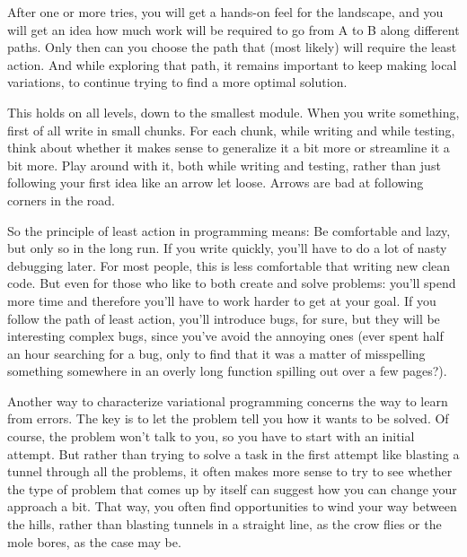 After one or more tries, you will get a hands-on feel for the landscape,
and you will get an idea how much work will be required to go from A
to B along different paths.  Only then can you choose the path that
(most likely) will require the least action.  And while exploring that
path, it remains important to keep making local variations, to
continue trying to find a more optimal solution.

This holds on all levels, down to the smallest module.
When you write something, first of all write in small
chunks.  For each chunk, while writing and while testing, think about
whether it makes sense to generalize it a bit more or streamline it a
bit more.  Play around with it, both while writing and testing, rather
than just following your first idea like an arrow let loose.  Arrows
are bad at following corners in the road.

So the principle of least action in programming means:
Be comfortable and lazy, but only so in the long run.
If you write quickly, you'll have to do a lot of nasty debugging later.
For most people, this is less comfortable that writing new clean code.
But even for those who like to both create and solve problems: you'll
spend more time and therefore you'll have to work harder to get at
your goal.  If you follow the path of least action, you'll introduce
bugs, for sure, but they will be interesting complex bugs, since
you've avoid the annoying ones (ever spent half an hour searching for
a bug, only to find that it was a matter of misspelling something
somewhere in an overly long function spilling out over a few pages?).

Another way to characterize variational programming concerns the
way to learn from errors.  The key is to let the problem tell you how
it wants to be solved.  Of course, the problem won't talk to you, so
you have to start with an initial attempt.  But rather than trying to
solve a task in the first attempt like blasting a tunnel through
all the problems, it often makes more sense to try to see whether the
type of problem that comes up by itself can suggest how you can change
your approach a bit.  That way, you often find opportunities to wind
your way between the hills, rather than blasting tunnels in a straight
line, as the crow flies or the mole bores, as the case may be.

